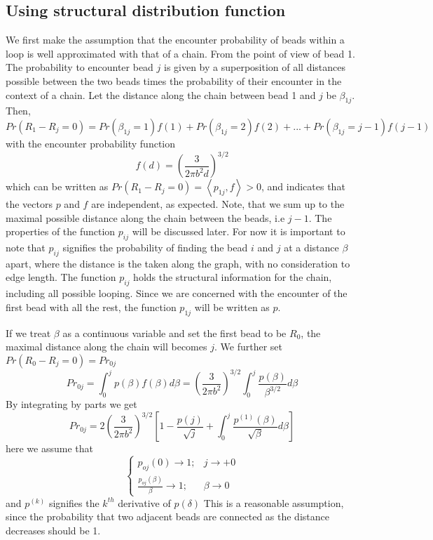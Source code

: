 \documentclass[12pt]{article}
\begin{document}
\subsection{Using structural distribution function}\label{subsection_usingStructuralDistributionFunction}
We first make the assumption that the encounter probability of beads within a loop is well approximated with that of a chain. From the point of view of bead 1. The probability to encounter bead $j$ is given by a superposition of all distances possible between the two beads times the probability of their encounter in the context of a chain. Let the distance along the chain between bead 1 and $j$ be $\beta_{1j}$. Then,
\begin{equation*}
Pr(R_1-R_j=0)=Pr(\beta_{1j}=1)f(1)+Pr(\beta_{1j}=2)f(2)+...+Pr(\beta_{1j}=j-1)f(j-1)
\end{equation*}
with the encounter probability function 
\begin{equation*}
f(d) = \left(\frac{3}{2\pi b^2 d}\right)^{3/2}
\end{equation*}
which can be written as $Pr(R_1-R_j=0)=\left<p_{1j},f\right> >0$, and indicates that the vectors $p$ and $f$ are independent, as expected. Note, that we sum up to the maximal possible distance along the chain between the beads, i.e $j-1$.
The properties of the function $p_{ij}$ will be discussed later. For now it is important to note that $p_{ij}$ signifies the probability of finding the bead $i$ and $j$ at a distance $\beta$ apart, where the distance is the taken along the graph, with no consideration to edge length. The function $p_{ij}$  holds the structural information for the chain, including all possible looping. Since we are concerned with the encounter of the first bead with all the rest, the function $p_{1j}$ will be written as $p$. 

If we treat $\beta$ as a continuous variable and set the first bead to be $R_0$, the maximal distance along the chain will becomes $j$. We further set $Pr(R_0-R_j=0)=Pr_{0j}$ 
\begin{equation*}
Pr_{0j}= \int_{0}^{j} p(\beta)f(\beta)d\beta= \left(\frac{3}{2\pi b^2}\right)^{3/2}\int_0^{j} \frac{p(\beta)}{\beta^{3/2}}d\beta
\end{equation*}
By integrating by parts we get 
\begin{equation}
Pr_{0j}=2\left(\frac{3}{2\pi b^2}\right)^{3/2}\left[1 -\frac{p(j)}{\sqrt{j}}+\int_0^{j}\frac{p^{(1)}(\beta)}{\sqrt{\beta}}d\beta  \right]
\end{equation}
here we assume that 
\begin{equation*}
\begin{cases}
p_{oj}(0)\rightarrow 1; & j\rightarrow +0\\
\frac{p_{oj}(\beta)}{\beta}\rightarrow 1; & \beta \rightarrow 0 
\end{cases}
\end{equation*}
 and $p^{(k)}$ signifies the $k^{th}$ derivative of $p(\delta)$
This is a reasonable assumption, since the probability that two adjacent beads are connected as the distance decreases should be 1. 
\end{document}
